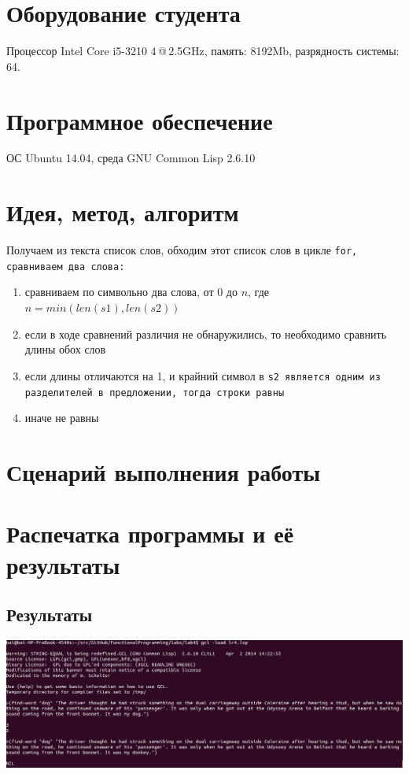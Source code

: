 \documentclass[12pt]{article}
\begin{document}
\section{Оборудование студента}
Процессор Intel Core i5-3210 4\,@\,2.5GHz, память: 8192Mb, разрядность системы: 64.

\section{Программное обеспечение}
ОС Ubuntu 14.04, среда GNU Common Lisp 2.6.10

\section{Идея, метод, алгоритм}
Получаем из текста список слов, обходим этот список слов в цикле \tt{for}, сравниваем два слова:
\begin{enumerate}
\item сравниваем по символьно два слова, от $0$ до $n$, где $n = min(len(s1), len(s2))$
\item если в ходе сравнений различия не обнаружились, то необходимо сравнить длины обох слов
\item если длины отличаются на 1, и крайний символ в \tt{s2} является одним из разделителей в предложении, тогда строки равны
\item иначе не равны
\end{enumerate}
\section{Сценарий выполнения работы}
\section{Распечатка программы и её результаты}

\subsection{Результаты}
\includegraphics[scale=0.5]{lr4Screen}
\end{document}
